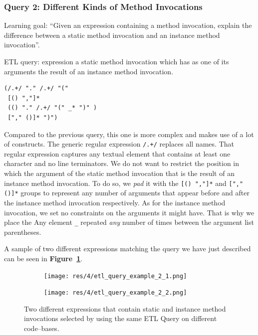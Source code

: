 \begin{chapterBody}
\subsubsection*{Query 2: Different Kinds of Method Invocations}

Learning goal: ``Given an expression containing a method invocation, explain the difference
between a static method invocation and an instance method invocation''.

ETL query: expression a static method invocation which
has as one of its arguments the result of an instance method
invocation.

\begin{lstlisting}[language=etl]
(/.+/ "." /.+/ "("
 [() ","]*
 (() "." /.+/ "(" _* ")" )
 ["," ()]* ")")
\end{lstlisting}

Compared to the previous query, this one is more complex and makes use of a
lot of constructs. The generic regular expression \lstinline[language=etl]{/.+/}
replaces all names. That regular expression captures any textual
element that contains at least one character and no line terminators.
We do not want to restrict the position in which the argument of the
static method invocation that is the result of an instance method invocation.
To do so, we \textit{pad} it with the \lstinline[language=etl]{[() ","]*} and
\lstinline[language=etl]{["," ()]*} groups to represent any number of arguments
that appear before and after the instance method invocation respectively.
As for the instance method invocation, we set no constraints on the arguments
it might have. That is why we place the Any element \lstinline[language=etl]{_}
repeated \textit{any} number of times between the argument list parentheses.

A sample of two different expressions matching the query we have just
described can be seen in
\textbf{Figure~\ref{fig:etl-eval-query-sample-invocation}}.

\begin{figure}[ht]
    \centering
    \begin{subfigure}[b]{.45\textwidth}
        \centering
        \texttt{[image: res/4/etl\_query\_example\_2\_1.png]}
    \end{subfigure}
    \begin{subfigure}[b]{.45\textwidth}
        \centering 
        \texttt{[image: res/4/etl\_query\_example\_2\_2.png]}
    \end{subfigure}
    \caption{Two different expressions that contain static and instance
method invocations selected by using the same ETL Query on different
code–bases.}
    \label{fig:etl-eval-query-sample-invocation}
\end{figure}

\end{chapterBody}
